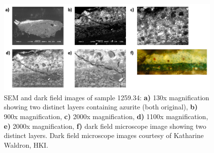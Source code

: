 \begin{figure}[H]
  \centering
  \includegraphics[width=\linewidth]{1259-34_imgs}
\caption[SEM and dark field images of sample 1259.34.]{SEM and dark field images of sample 1259.34: \textbf{a)} 130x magnification showing two distinct layers containing azurite (both original), \textbf{b)} 900x magnification, \textbf{c)} 2000x magnification, \textbf{d)} 1100x magnification, \textbf{e)} 2000x magnification, \textbf{f)} dark field microscope image showing two distinct layers. Dark field microscope images courtesy of Katharine Waldron, HKI.}
\label{fig:1259.34_imgs}
\end{figure}

